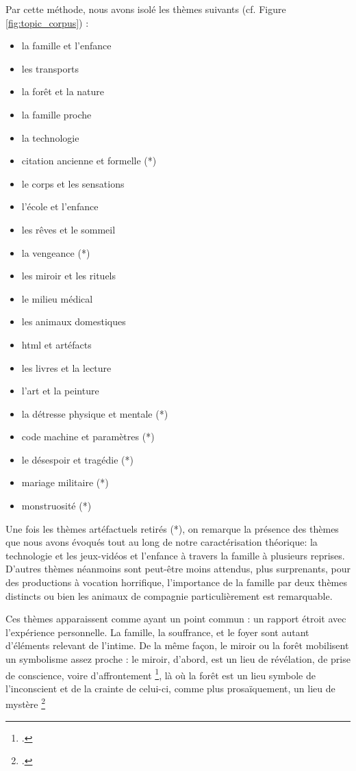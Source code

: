 \documentclass[12pt,a4paper,oneside,titlepage]{book} %
\begin{document}
	Par cette méthode,  nous avons isolé les thèmes suivants (cf. Figure \ref{fig:topic_corpus}) : 
	\begin{itemize}
		\item la famille et l'enfance
		\item les transports 
		\item la forêt et la nature
		\item la famille proche
		\item la technologie 
		\item citation ancienne et formelle (*)
		\item le corps et les sensations
		\item l'école et l'enfance
		\item les rêves et le sommeil
		\item la vengeance (*)
		\item les miroir et les rituels
		\item le milieu médical
        \item les animaux domestiques
        \item html et artéfacts
        \item les livres et la lecture
        \item l'art et la peinture
        \item la détresse physique et mentale (*)
        \item code machine et paramètres (*)
        \item le désespoir et tragédie (*)
        \item mariage militaire (*)
        \item monstruosité (*)\\

		\end{itemize} 
Une fois les thèmes artéfactuels retirés (*), on remarque la présence des thèmes que nous avons évoqués tout au long de notre caractérisation théorique: la technologie et les jeux-vidéos et l'enfance à travers la famille à plusieurs reprises. D'autres thèmes néanmoins sont peut-être moins attendus, plus surprenants, pour des productions à vocation horrifique, l'importance de la famille par deux thèmes distincts ou bien les animaux de compagnie particulièrement est remarquable. 
    
    	Ces thèmes apparaissent comme ayant un point commun : un rapport étroit avec l'expérience personnelle. La famille, la souffrance, et le foyer sont autant d'éléments relevant de l'intime. 
    	De la même façon, le miroir ou la forêt mobilisent un symbolisme assez proche : le miroir, d'abord, est un lieu de révélation, de prise de conscience, voire d'affrontement \footcite[voir p.639, article "Miroir"]{chevalier_dictionnaire_1990}, là où la forêt est un lieu symbole de l'inconscient et de la crainte de celui-ci, comme plus prosaïquement, un lieu de mystère \footcite[voir p.455, article "Forêt"]{chevalier_dictionnaire_1990}
\end{document}

